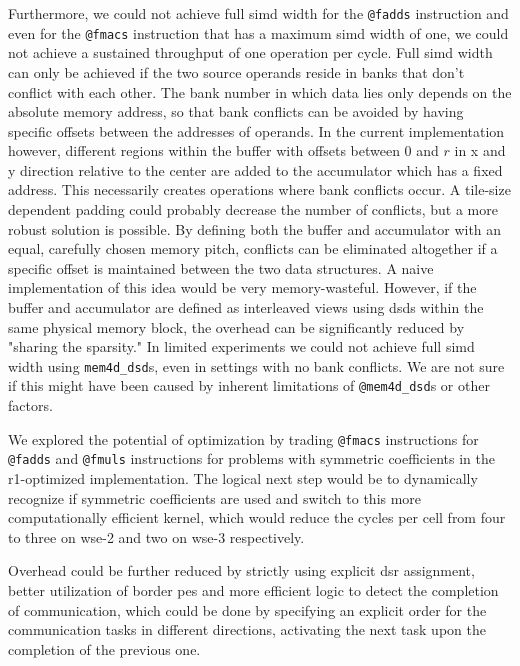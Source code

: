 Furthermore, we could not achieve  full \ac{simd} width for the \texttt{@fadds} instruction and even for the \texttt{@fmacs} instruction that has a maximum \ac{simd} width of one, we could not achieve a sustained throughput of one operation per cycle. Full \ac{simd} width can only be achieved if the two source operands reside in banks that don't conflict with each other. The bank number in which data lies only depends on the absolute memory address, so that bank conflicts can be avoided by having specific offsets between the addresses of operands. In the current implementation however, different regions within the buffer with offsets between 0 and $r$ in x and y direction relative to the center are added to the accumulator which has a fixed address.
This necessarily creates operations where bank conflicts occur.
A tile-size dependent padding could probably decrease the number of conflicts, but a more robust solution is possible.
By defining both the buffer and accumulator with an equal, carefully chosen memory pitch, conflicts can be eliminated altogether if a specific offset is maintained between the two data structures.
A naive implementation of this idea would be very memory-wasteful.
However, if the buffer and accumulator are defined as interleaved views using \acp{dsd} within the same physical memory block, the overhead can be significantly reduced by "sharing the sparsity."
In limited experiments we could not achieve  full \ac{simd} width using \texttt{mem4d\_dsd}s, even in settings with no bank conflicts. We are not sure if this might have been caused by inherent limitations of \texttt{@mem4d\_dsd}s or other factors.

We explored the potential of optimization by trading \texttt{@fmacs} instructions for \texttt{@fadds} and \texttt{@fmuls} instructions for problems with symmetric coefficients in the r1-optimized implementation. The logical next step would be to dynamically recognize if symmetric coefficients are used and switch to  this more computationally efficient kernel, which would reduce the cycles per cell from four to three on \ac{wse}-2 and two on \ac{wse}-3 respectively.

Overhead could be further reduced by strictly using explicit \ac{dsr} assignment, better utilization of border \acp{pe} and more efficient logic to detect the completion of communication, which could be done by specifying an explicit order for the communication tasks in different directions, activating the next task upon the completion of the previous one.

